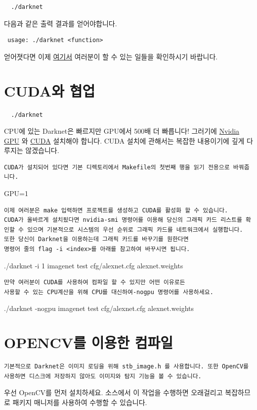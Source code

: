 \documentclass{article}
\begin{document}
\begin{verbatim}
  ./darknet 
\end{verbatim}
다음과 같은 출력 결과를 얻어야합니다.
\begin{verbatim}
 usage: ./darknet <function>

\end{verbatim}
얻어졋다면 이제 \href{http://www.sharelatex.com}{여기서} 여러분이 
할 수 있는 일들을 확인하시기 바랍니다.

\section{CUDA와 협업}

\begin{verbatim}
  ./darknet 
\end{verbatim}
CPU에 있는 Darknet은 빠르지만 GPU에서 500배 더 빠릅니다! 그러기에  \href{http://www.sharelatex.com}{Nvidia GPU} 와 \href{http://www.sharelatex.com}{CUDA} 설치해야 합니다. 
CUDA 설치에 관해서는 복잡한 내용이기에 깊게 다루지는 않겠습니다.

\begin{verbatim}
CUDA가 설치되어 있다면 기본 디렉토리에서 Makefile의 첫번째 행을 읽기 전용으로 바꿔줍니다.
\end{verbatim}
 GPU=1 

\begin{verbatim}
이제 여러분은 make 입력하면 프로젝트를 생성하고 CUDA를 활성화 할 수 있습니다. 
CUDA가 올바르게 설치됬다면 nvidia-smi 명령어를 이용해 당신의 그래픽 카드 리스트를 확인할 수 있으며 기본적으로 시스템의 우선 순위로 그래픽 카드를 네트워크에서 실행합니다. 
또한 당신이 Darknet을 이용하는데 그래픽 카드를 바꾸기를 원한다면
명령어 줄의 flag -i <index>를 아래를 참고하여 바꾸시면 됩니다.
\end{verbatim}
  ./darknet -i 1 imagenet test cfg/alexnet.cfg alexnet.weights 
 
\begin{verbatim}
만약 여러분이 CUDA를 사용하여 컴파일 할 수 있지만 어떤 이유로든 
사용할 수 있는 CPU계산을 위해 CPU를 대신하여-nogpu 명령어를 사용하세요.
\end{verbatim}
   ./darknet -nogpu imagenet test cfg/alexnet.cfg alexnet.weights 

\section{OPENCV를 이용한 컴파일}

\begin{verbatim}
기본적으로 Darknet은 이미지 로딩을 위해 stb_image.h 를 사용합니다. 또한 OpenCV를 사용하면 디스크에 저장하지 않아도 이미지와 탐지 기능을 볼 수 있습니다.
\end{verbatim}
우선 OpenCV를 먼저 설치하세요.
소스에서 이 작업을 수행하면 오래걸리고 복잡하므로 패키지 매니저를 사용하여 수행할 수 있습니다.
\end{document}
